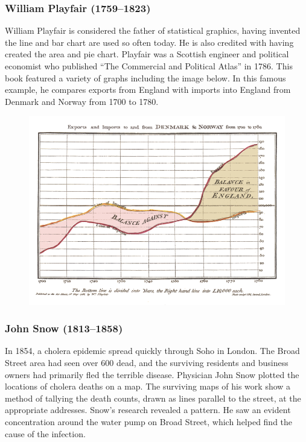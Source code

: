 \documentclass[]{book}
\theoremstyle{definition}
\theoremstyle{definition}
\theoremstyle{definition}
\theoremstyle{remark}
\begin{document}
\subsubsection{William Playfair
(1759--1823)}\label{william-playfair-17591823}

William Playfair is considered the father of statistical graphics,
having invented the line and bar chart are used so often today. He is
also credited with having created the area and pie chart. Playfair was a
Scottish engineer and political economist who published ``The Commercial
and Political Atlas'' in 1786. This book featured a variety of graphs
including the image below. In this famous example, he compares exports
from England with imports into England from Denmark and Norway from 1700
to 1780.

\begin{figure}
\centering
\includegraphics{images/Playfair.png}
\caption{}
\end{figure}

\subsubsection{John Snow (1813--1858)}\label{john-snow-18131858}

In 1854, a cholera epidemic spread quickly through Soho in London. The
Broad Street area had seen over 600 dead, and the surviving residents
and business owners had primarily fled the terrible disease. Physician
John Snow plotted the locations of cholera deaths on a map. The
surviving maps of his work show a method of tallying the death counts,
drawn as lines parallel to the street, at the appropriate addresses.
Snow's research revealed a pattern. He saw an evident concentration
around the water pump on Broad Street, which helped find the cause of
the infection.
\end{document}
